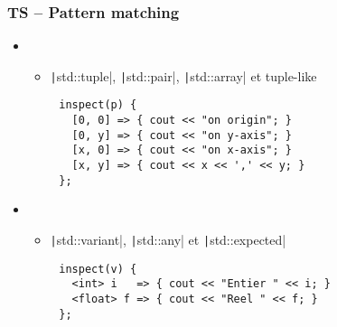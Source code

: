 \documentclass[C++.tex]{subfiles}
\begin{document}
\begin{frame}[fragile]
	\frametitle{TS -- Pattern matching}
	\begin{itemize}
		\item[]
		\begin{itemize}
			\item \texttt|std::tuple|, \texttt|std::pair|, \texttt|std::array| et tuple-like
		\end{itemize}
	\end{itemize}

	\begin{verbatim}
		inspect(p) {
		  [0, 0] => { cout << "on origin"; }
		  [0, y] => { cout << "on y-axis"; }
		  [x, 0] => { cout << "on x-axis"; }
		  [x, y] => { cout << x << ',' << y; }
		};
	\end{verbatim}

	\begin{itemize}
		\item []
		\begin{itemize}
			\item \texttt|std::variant|, \texttt|std::any| et \texttt|std::expected|
		\end{itemize}
	\end{itemize}

	\begin{verbatim}
		inspect(v) {
		  <int> i   => { cout << "Entier " << i; }
		  <float> f => { cout << "Reel " << f; }
		};
	\end{verbatim}


\end{frame}
\end{document}
